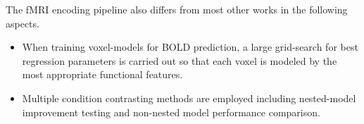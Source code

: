 \begin{declarationauthorship}
    The fMRI encoding pipeline also differs from most other works in the following aspects.
    \begin{itemize}
    \item When training voxel-models for BOLD prediction, a large grid-search for best regression parameters is carried out so that each voxel is modeled by the most appropriate functional features. 
    \item Multiple condition contrasting methods are employed including nested-model improvement testing and non-nested model performance comparison.
    \end{itemize}

    \end{declarationauthorship}
    
    \clearpage